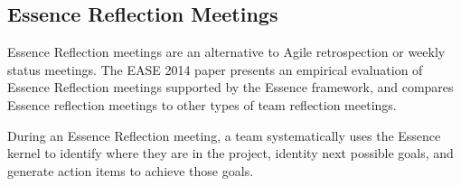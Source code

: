 \documentclass[preprint,12pt,3p]{elsarticle}
\begin{document}
\subsection{Essence Reflection Meetings}
\label{EssenceReflectionMeetings}
Essence Reflection meetings are an alternative to Agile retrospection or weekly status meetings. The EASE 2014 paper \cite{EASE2014} presents an empirical evaluation of Essence Reflection meetings supported by the Essence framework, and compares Essence reflection meetings to other types of team reflection meetings.

During an Essence Reflection meeting, a team systematically uses the Essence kernel to identify where they are in the project, identity next possible goals, and generate action items to achieve those goals. 

\end{document}
